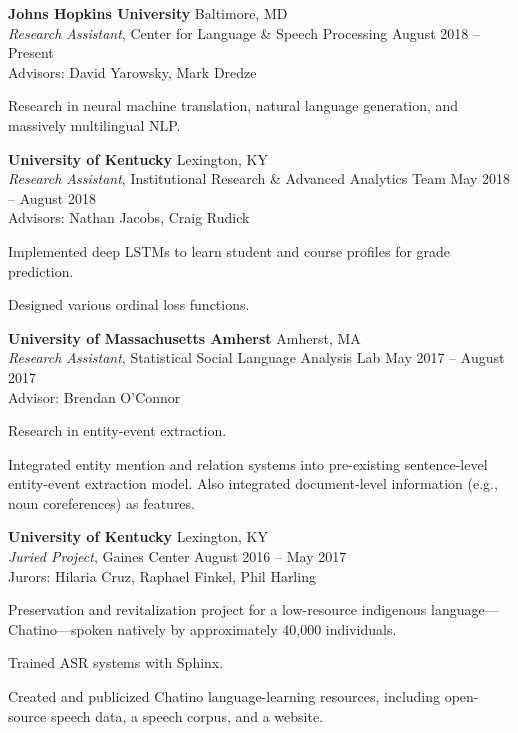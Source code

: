 \documentclass[10pt]{article}
\newcommand{\halfblankline}{\quad\vspace{-0.5\baselineskip}\pagebreak[3]}
\begin{document}
	\halfblankline

	{\textbf{Johns Hopkins University}}
	\hfill Baltimore, MD\\
		\textit{Research Assistant}, Center for Language \& Speech Processing
		\hfill August 2018 -- Present \\
		Advisors: David Yarowsky, Mark Dredze
		\begin{innerlist}
			\item Research in neural machine translation, natural language generation, and massively multilingual NLP.
		\end{innerlist}
	
	\halfblankline

	{\textbf{University of Kentucky}}
	\hfill Lexington, KY\\
		\textit{Research Assistant}, Institutional Research \& Advanced Analytics Team
		\hfill May 2018 -- August 2018\\
		Advisors: Nathan Jacobs, Craig Rudick
		\begin{innerlist}
			\item Implemented deep LSTMs to learn student and course profiles for grade prediction.
			\item Designed various ordinal loss functions.
		\end{innerlist}

	\halfblankline

	{\textbf{University of Massachusetts Amherst}}
	\hfill Amherst, MA\\
		\textit{Research Assistant}, Statistical Social Language Analysis Lab
		\hfill May 2017 -- August 2017\\
		Advisor: Brendan O'Connor
		\begin{innerlist}
			\item Research in entity-event extraction.
			\item Integrated entity mention and relation systems into pre-existing sentence-level entity-event extraction model. Also integrated document-level information (e.g., noun coreferences) as features.
		\end{innerlist}
	
	\halfblankline
	
	{\textbf{University of Kentucky}}
	\hfill Lexington, KY\\
		\textit{Juried Project}, Gaines Center
		\hfill August 2016 -- May 2017\\
		Jurors: Hilaria Cruz, Raphael Finkel, Phil Harling
		\begin{innerlist}
			\item Preservation and revitalization project for a low-resource indigenous language---Chatino---spoken natively by approximately 40,000 individuals.
			\item Trained ASR systems with Sphinx.
			\item Created and publicized Chatino language-learning resources, including open-source speech data, a speech corpus, and a website.
		\end{innerlist}
	
\end{document}
